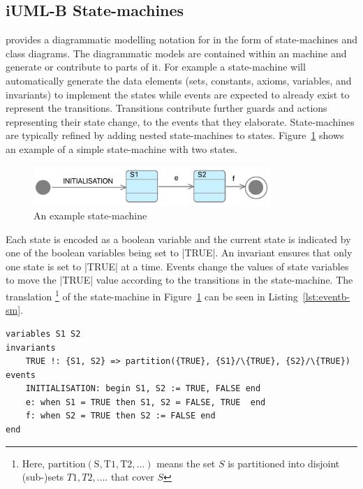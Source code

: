 
\subsection{iUML-B State-machines}
\label{sec:iumlb}

\iUMLB provides a diagrammatic modelling notation for \EventB in the form of state-machines and class diagrams. 
The diagrammatic models are contained within an \EventB machine and generate or contribute to parts of it. 
For example a state-machine will automatically generate the \EventB data elements (sets, constants, axioms, variables, and invariants) to implement the states while \EventB events are expected to already exist to represent the transitions. 
Transitions contribute further guards and actions representing their state change, to the events that they elaborate.  
State-machines are typically refined by adding nested state-machines to states.
Figure~\ref{fig:iumlb-sm} shows an example of a simple state-machine with two states.
\begin{figure}[!htbp]
	\centering
	\includegraphics[width=0.8\textwidth]{figures/iumlb-SM}
	\caption{An example \iUMLB state-machine}
	\label{fig:iumlb-sm}
\end{figure}

Each state is encoded as a boolean variable and the current state is indicated by one of the boolean variables being set to |TRUE|. 
An invariant ensures that only one state is set to |TRUE| at a time.
Events change the values of state variables to move the |TRUE| value according to the transitions in the state-machine.  
The \EventB translation%
%
\footnote{%
  Here, $\mathrm{partition(S, T1, T2, \ldots)}$ means the set $S$ is partitioned into disjoint (sub-)sets $T1, T2, \ldots$.
that cover $S$} %
of the state-machine in Figure~\ref{fig:iumlb-sm} can be seen in Listing~\ref{lst:eventb-sm}.%
\begin{lstlisting}[caption={Translation of the state-machine in Fig.~\ref{fig:iumlb-sm}},label={lst:eventb-sm}, language=Event-B, escapechar=|, frame=single]
 variables S1 S2
invariants 
	TRUE !: {S1, S2} => partition({TRUE}, {S1}/\{TRUE}, {S2}/\{TRUE})
events
    INITIALISATION: begin S1, S2 := TRUE, FALSE end
    e: when S1 = TRUE then S1, S2 ≔ FALSE, TRUE  end
    f: when S2 = TRUE then S2 := FALSE end
end
\end{lstlisting}	
	

